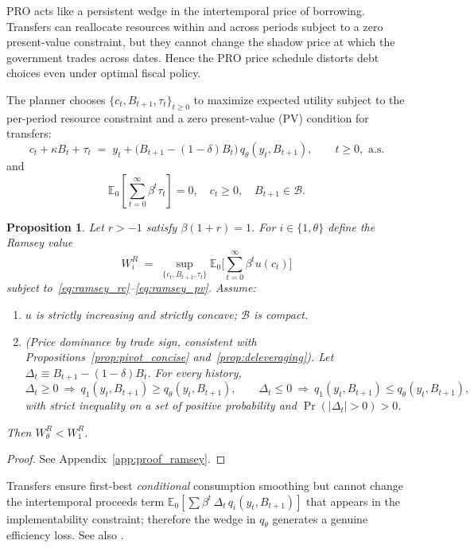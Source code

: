 \documentclass[12pt]{article}
\theoremstyle{plain}
\newtheorem{proposition}{Proposition}
\newcommand{\E}{\mathbb{E}}
\begin{document}
PRO acts like a persistent wedge in the intertemporal price of borrowing.
Transfers can reallocate resources within and across periods subject to a zero
present-value constraint, but they cannot change the shadow price at which the
government trades across dates. Hence the PRO price schedule distorts debt
choices even under optimal fiscal policy.

The planner chooses $\{c_t,B_{t+1},\tau_t\}_{t\ge0}$ to maximize expected
utility subject to the per-period resource constraint and a zero present-value
(PV) condition for transfers:
\begin{equation}
	c_t+\kappa B_t+\tau_t \;=\; y_t+\bigl(B_{t+1}-(1-\delta)B_t\bigr)\,q_\theta(y_t,B_{t+1}),
	\qquad t\ge0, \text{ a.s.}
	\label{eq:ramsey_rc}
\end{equation}
and
\begin{equation}
	\E_0\!\left[\sum_{t=0}^\infty \beta^t \tau_t\right]=0,
	\quad c_t\ge0,
	\quad B_{t+1}\in\mathcal B.
	\label{eq:ramsey_pv}
\end{equation}

\begin{proposition}
	\label{prop:ramsey_welfare}
	Let $r>-1$ satisfy $\beta(1+r)=1$. For $i\in\{1,\theta\}$ define the Ramsey value
	\[
		W^R_i \;=\; \sup_{\{c_t,B_{t+1},\tau_t\}}\E_0\!\Big[\sum_{t=0}^\infty \beta^t u(c_t)\Big]
	\]
	subject to~\eqref{eq:ramsey_rc}--\eqref{eq:ramsey_pv}. Assume:
	\begin{enumerate}
		\item[(A1)] $u$ is strictly increasing and strictly concave; $\mathcal B$ is compact.
		\item[(A2)] (Price dominance by trade sign, consistent with Propositions~\ref{prop:pivot_concise} and~\ref{prop:deleveraging}). Let $\Delta_t\equiv B_{t+1}-(1-\delta)B_t$. For every history,
		      \[
			      \Delta_t\ge0 \ \Rightarrow\ q_1(y_t,B_{t+1})\ge q_\theta(y_t,B_{t+1}),\qquad
			      \Delta_t\le0 \ \Rightarrow\ q_1(y_t,B_{t+1})\le q_\theta(y_t,B_{t+1}),
		      \]
		      with strict inequality on a set of positive probability and
		      $\Pr(|\Delta_t|>0)>0$.
	\end{enumerate}
	Then $W^R_\theta<W^R_1$.
\end{proposition}

\begin{proof}
	See Appendix~\ref{app:proof_ramsey}.
\end{proof}

Transfers ensure first-best \emph{conditional} consumption smoothing but cannot
change the intertemporal proceeds term $\E_0[\sum
	\beta^t\,\Delta_t\,q_i(y_t,B_{t+1})]$ that appears in the implementability
constraint; therefore the wedge in $q_\theta$ generates a genuine efficiency
loss. See also \citep{AiyagariMarcetSargentSeppala2002}.
\end{document}
